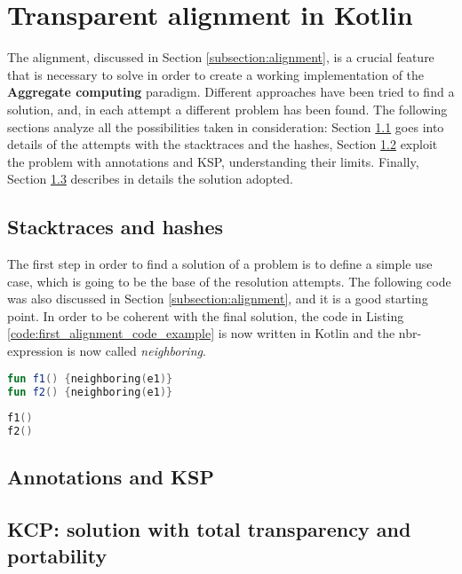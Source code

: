 \chapter{Transparent alignment in Kotlin}\label{chapter:alignment}
The alignment, discussed in Section \ref{subsection:alignment}, is a crucial feature that is necessary to solve in order to create a working implementation of the \textbf{Aggregate computing} paradigm. Different approaches have been tried to find a solution, and, in each attempt a different problem has been found. The following sections analyze all the possibilities taken in consideration: Section \ref{section:stacktraces_hashes} goes into details of the attempts with the stacktraces and the hashes, Section \ref{section_annotation_ksp} exploit the problem with annotations and KSP, understanding their limits. Finally, Section \ref{section:compiler_plugin_solution} describes in details the solution adopted.

\section{Stacktraces and hashes}\label{section:stacktraces_hashes}
The first step in order to find a solution of a problem is to define a simple use case, which is going to be the base of the resolution attempts. The following code was also discussed in Section \ref{subsection:alignment}, and it is a good starting point. In order to be coherent with the final solution, the code in Listing \ref{code:first_alignment_code_example} is now written in Kotlin and the nbr-expression is now called \textit{neighboring}.
\begin{lstlisting}[caption={Creation of compiler option that enables or disables the plugin}, captionpos=b, language=Kotlin, label={code:first_alignment_code_example}]
fun f1() {neighboring(e1)}
fun f2() {neighboring(e1)}
        
f1()
f2()
\end{lstlisting}


\section{Annotations and KSP}\label{section_annotation_ksp}
\section{KCP: solution with total transparency and portability}\label{section:compiler_plugin_solution}
